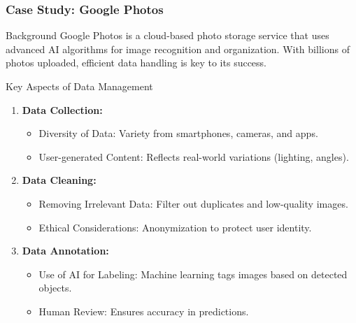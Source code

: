 \documentclass[aspectratio=169]{beamer}
\begin{document}
\begin{frame}[fragile]
    \frametitle{Case Study: Google Photos}
    \begin{block}{Background}
        Google Photos is a cloud-based photo storage service that uses advanced AI algorithms for image recognition and organization. With billions of photos uploaded, efficient data handling is key to its success.
    \end{block}

    \begin{block}{Key Aspects of Data Management}
        \begin{enumerate}
            \item \textbf{Data Collection:}
            \begin{itemize}
                \item Diversity of Data: Variety from smartphones, cameras, and apps.
                \item User-generated Content: Reflects real-world variations (lighting, angles).
            \end{itemize}
            \item \textbf{Data Cleaning:}
            \begin{itemize}
                \item Removing Irrelevant Data: Filter out duplicates and low-quality images.
                \item Ethical Considerations: Anonymization to protect user identity.
            \end{itemize}
            \item \textbf{Data Annotation:}
            \begin{itemize}
                \item Use of AI for Labeling: Machine learning tags images based on detected objects.
                \item Human Review: Ensures accuracy in predictions.
            \end{itemize}
        \end{enumerate}
    \end{block}
\end{frame}
\end{document}
